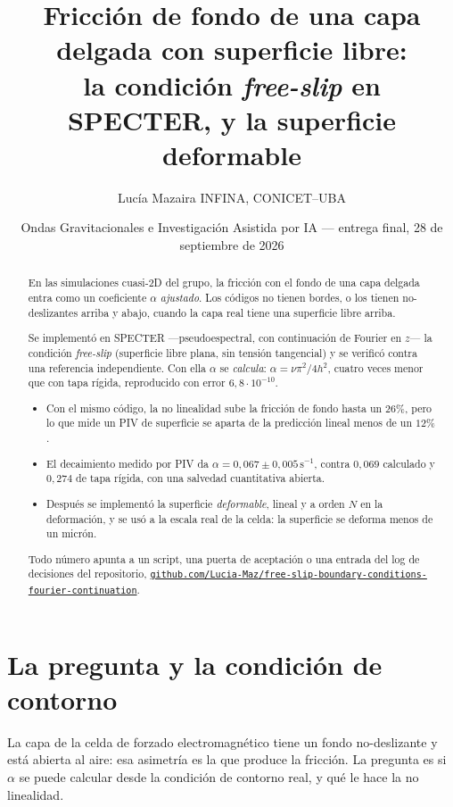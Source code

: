\documentclass[11pt,a4paper]{article}
\title{\vspace{-1.0cm}Fricción de fondo de una capa delgada con superficie libre:\\
la condición \emph{free-slip} en SPECTER, y la superficie deformable}
\author{Lucía Mazaira \quad\small INFINA, CONICET--UBA}
\date{\small Ondas Gravitacionales e Investigación Asistida por IA --- entrega final, 28 de septiembre de 2026}
\newcommand{\repo}{\href{https://github.com/Lucia-Maz/free-slip-boundary-conditions-fourier-continuation}{\texttt{github.com/Lucia-Maz/free-slip-boundary-conditions-fourier-continuation}}}
\begin{document}
\maketitle
\vspace{-0.7cm}

\begin{abstract}
\noindent
En las simulaciones cuasi-2D del grupo, la fricción con el fondo de una capa delgada entra
como un coeficiente $\alpha$ \emph{ajustado}. Los códigos no tienen bordes, o los tienen
no-deslizantes arriba y abajo, cuando la capa real tiene una superficie libre arriba.

Se implementó en SPECTER ---pseudoespectral, con continuación de Fourier en $z$--- la
condición \emph{free-slip} (superficie libre plana, sin tensión tangencial) y se verificó contra
una referencia independiente. Con ella $\alpha$ se \emph{calcula}: $\alpha=\nu\pi^2/4h^2$, cuatro
veces menor que con tapa rígida, reproducido con error $6{,}8\cdot10^{-10}$.
\begin{itemize}
\item Con el mismo código, la no linealidad sube la fricción de fondo hasta un $26\%$, pero lo
  que mide un PIV de superficie se aparta de la predicción lineal menos de un $12\%$.
\item El decaimiento medido por PIV da $\alpha=0{,}067\pm0{,}005\,\mathrm{s^{-1}}$, contra
  $0{,}069$ calculado y $0{,}274$ de tapa rígida, con una salvedad cuantitativa abierta.
\item Después se implementó la superficie \emph{deformable}, lineal y a orden $N$ en la
  deformación, y se usó a la escala real de la celda: la superficie se deforma menos de un
  micrón.
\end{itemize}
Todo número apunta a un script, una puerta de aceptación o una entrada del log de decisiones
del repositorio, \repo.
\end{abstract}

\section{La pregunta y la condición de contorno}

La capa de la celda de forzado electromagnético tiene un fondo no-deslizante y está abierta al
aire: esa asimetría es la que produce la fricción. La pregunta es si $\alpha$ se puede
calcular desde la condición de contorno real, y qué le hace la no linealidad.
\end{document}
